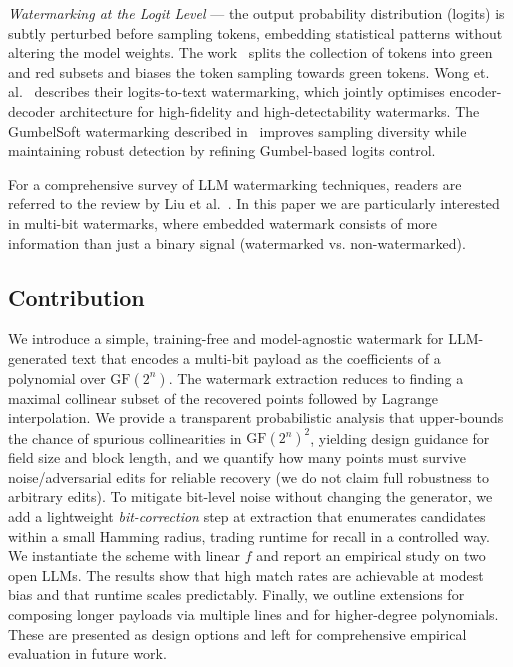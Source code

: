 \documentclass[a4paper,11pt]{llncs}
\newcommand{\GF}{\mathrm{GF}}
\begin{document}
\textit{Watermarking at the Logit Level} --- the output probability distribution (logits) is subtly perturbed before sampling tokens, embedding statistical patterns without altering the model weights. The work~\cite{Kirchenbauer_2023} splits the collection of tokens into green and red subsets and biases the token sampling towards green tokens.  Wong et. al.~\cite{wong_2025} describes their logits-to-text watermarking, which jointly optimises encoder-decoder architecture for high-fidelity and high-detectability watermarks. The GumbelSoft watermarking described in~\cite{Fu_2024} improves sampling diversity while maintaining robust detection by refining Gumbel-based logits control.

For a comprehensive survey of LLM watermarking techniques, readers are referred to the review by Liu et al.~\cite{Liu_2023review}. In this paper we are particularly interested in multi-bit watermarks, where embedded watermark consists of more information than just a binary signal (watermarked vs. non-watermarked). 


\subsection{Contribution}
We introduce a simple, training-free and model-agnostic watermark for LLM-generated text that encodes a multi-bit payload as the coefficients of a polynomial over $\GF(2^{n})$. The watermark extraction reduces to finding a maximal collinear subset of the recovered points followed by Lagrange interpolation. We provide a transparent probabilistic analysis that upper-bounds the chance of spurious collinearities in $\GF(2^{n})^2$, yielding design guidance for field size and block length, and we quantify how many points must survive noise/adversarial edits for reliable recovery (we do not claim full robustness to arbitrary edits). To mitigate bit-level noise without changing the generator, we add a lightweight \emph{bit-correction} step at extraction that enumerates candidates within a small Hamming radius, trading runtime for recall in a controlled way. We instantiate the scheme with linear $f$ and report an empirical study on two open LLMs. The results show that high match rates are achievable at modest bias and that runtime scales predictably. Finally, we outline extensions for composing longer payloads via multiple lines and for higher-degree polynomials. These are presented as design options and left for comprehensive empirical evaluation in future work.
\end{document}
